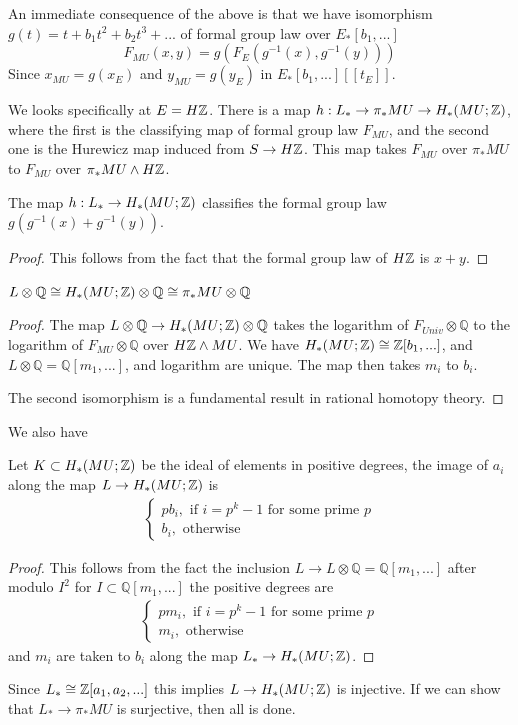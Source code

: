 An immediate consequence of the above is that we have isomorphism $g(t)=t+b_1t^2+b_2t^3+...$ of formal group law over $E_*[b_1,...]$
\[
F_{MU}(x,y)=g(F_E(g^{-1}(x),g^{-1}(y)))
\]
Since $x_{MU}=g(x_E)$ and $y_{MU}=g(y_E)$ in $E_*[b_1,...][[t_E]]$.

We looks specifically at $E=H\mathbb{Z}$. There is a map $h:L_*\to \pi_*MU\to H_*(MU;\mathbb{Z})$, where the first is the classifying map of formal group law $F_{MU}$, and the second one is the Hurewicz map induced from $S\to H\mathbb{Z}$. This map takes $F_{MU}$ over $\pi_*MU$ to $F_{MU}$ over $\pi_*MU\wedge H\mathbb{Z}$.
\begin{lemma}
    The map $h: L_*\to H_*(MU;\mathbb{Z})$ classifies the formal group law $g(g^{-1}(x)+g^{-1}(y))$. 
\end{lemma}
\begin{proof}
    This follows from the fact that the formal group law of $H\mathbb{Z}$ is $x+y$.
\end{proof}

\begin{corollary}
    $L\otimes \mathbb{Q}\cong H_*(MU;\mathbb{Z})\otimes \mathbb{Q}\cong \pi_*MU\otimes \mathbb{Q}$
\end{corollary}
\begin{proof}
    The map $L\otimes \mathbb{Q}\to  H_*(MU;\mathbb{Z})\otimes \mathbb{Q}$ takes the logarithm of $F_{Univ}\otimes \mathbb{Q}$ to the logarithm of $F_{MU}\otimes \mathbb{Q}$ over $H\mathbb{Z}\wedge MU$. We have $H_*(MU;\mathbb{Z})\cong \mathbb{Z}[b_1,...]$, and $L\otimes \mathbb{Q}=\mathbb{Q}[m_1,...]$, and logarithm are unique. The map then takes $m_i$ to $b_i$.

    The second isomorphism is a fundamental result in rational homotopy theory.
\end{proof}
We also have 
\begin{lemma}
    Let $K\subset H_*(MU;\mathbb{Z})$ be the ideal of elements in positive degrees, the image of $a_i$ along the map $L\to H_*(MU;\mathbb{Z})$ is 
    \begin{align*}
        \begin{cases}
            pb_i, \text{ if $i=p^k-1$ for some prime $p$}
            \\ b_i, \text{ otherwise}
        \end{cases}
    \end{align*}
\end{lemma}
\begin{proof}
    This follows from the fact the inclusion $L\to L\otimes \mathbb{Q}=\mathbb{Q}[m_1,...]$ after modulo $I^2$ for $I\subset \mathbb{Q}[m_1,...]$ the positive degrees are 
      \begin{align*}
        \begin{cases}
            pm_i, \text{ if $i=p^k-1$ for some prime $p$}
            \\ m_i, \text{ otherwise}
        \end{cases}
    \end{align*}and $m_i$ are taken to $b_i$ along the map $L_*\to H_*(MU;\mathbb{Z})$.
\end{proof}
Since $L_*\cong \mathbb{Z}[a_1,a_2,...]$ this implies $L\to H_*(MU;\mathbb{Z})$ is injective. If we can show that $L_*\to \pi_*MU$ is surjective, then all is done.


